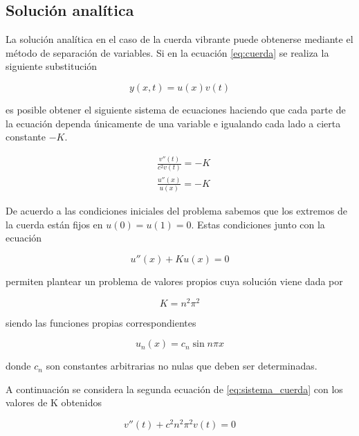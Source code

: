 \documentclass[11pt]{article}
\begin{document}
\subsection{Solución analítica}
\label{sec:sol_analitica}
La solución analítica en el caso de la cuerda vibrante puede obtenerse mediante el método
de separación de variables. Si en la ecuación \eqref{eq:cuerda} se realiza la siguiente
substitución

\begin{equation}
y(x,t) = u(x)v(t)
\end{equation}

es posible obtener el siguiente sistema de ecuaciones haciendo que cada parte de la ecuación
dependa únicamente de una variable e igualando cada lado a cierta constante $-K$.

\begin{subequations}
\begin{flalign}
	&\frac{v''(t)}{c^2v(t)} = -K\\
	&\frac{u''(x)}{u(x)} = -K
\end{flalign}
\label{eq:sistema_cuerda}
\end{subequations}

De acuerdo a las condiciones iniciales del problema sabemos que los extremos de la cuerda
están fijos en $u(0) = u(1) = 0$. Estas condiciones junto con la ecuación

\begin{equation}
	u''(x) + Ku(x) = 0
\end{equation}

permiten plantear un problema de valores propios cuya solución viene dada por

\begin{equation}
	K = n^2\pi^2
\end{equation}

siendo las funciones propias correspondientes

\begin{equation}
	u_n(x) = c_n\sin{n\pi{x}}
\end{equation}

donde $c_n$ son constantes arbitrarias no nulas que deben ser determinadas.

A continuación se considera la segunda ecuación de \eqref{eq:sistema_cuerda} con los
valores de K obtenidos

\begin{equation}
	v''(t) + c^2n^2\pi^2v(t) = 0
\end{equation}
 
\end{document}
